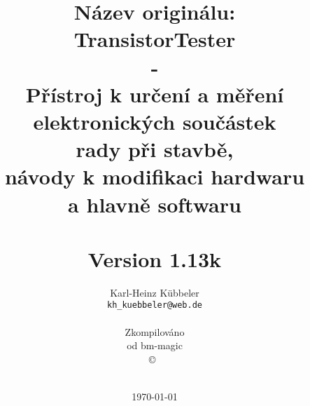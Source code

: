 \documentclass[pdftex,12pt,a4paper,oneside,czech]{report}
\begin{document}
\begin{figure}[t]
\end{figure}

\newcommand\electricC {
\hspace{-10pt}
\begin{circuitikz}
\draw (0,0) to[capacitor] (0:1);
\end{circuitikz}
\hspace{-6pt}
}
\newcommand\electricR {
\hspace{-10pt}
\begin{circuitikz}
\draw (0,0) to[european resistor] (0:1);
\end{circuitikz}
\hspace{-6pt}
}
\newcommand\electricL {
\hspace{-10pt}
\begin{circuitikz}
\draw (0,0) 
 to[american inductor] (-1,0) 
;\end{circuitikz}
\hspace{-6pt}
}
\newcommand\electricDAK {
\begin{circuitikz}
\draw (0,0) to[full diode] (0:1);
\end{circuitikz}
}
\newcommand\electricDKA {
\begin{circuitikz}
\draw (0,0) to[full diode] (180:1);
\end{circuitikz}
}
\title{Název originálu:\\
TransistorTester
\\-
\\Přístroj k určení a měření elektronických součástek \\
rady při stavbě,\\
návody k modifikaci hardwaru\\ 
a hlavně softwaru\\
~\\
Version 1.13k \\
}
\author{Karl-Heinz Kübbeler\\
\texttt{kh\_kuebbeler@web.de}
\\
\\
\vspace{-0.3cm}
{\scriptsize Zkompilováno}\\
{\scriptsize od bm-magic}\\
\copyright~\\
~\\
\vspace{-0.3cm}
}
\date{\today}
\maketitle
\tableofcontents
\end{document}
